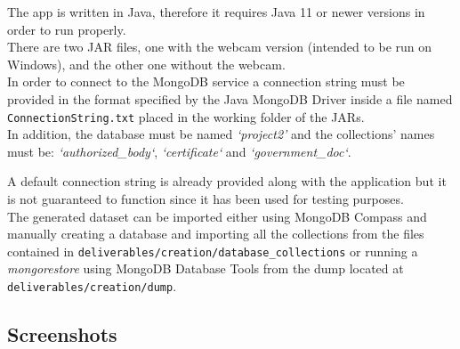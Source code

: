 \documentclass[12pt, a4paper]{article}
\begin{document}
The app is written in Java, therefore it requires Java 11 or newer versions in order to 
run properly. \\
There are two JAR files, one with the webcam version (intended to be run on Windows), 
and the other one without the webcam. \\
In order to connect to the MongoDB service a connection string must be provided in the
format specified by the Java MongoDB Driver inside a file named \\
\texttt{ConnectionString.txt} placed in the working folder of the JARs. \\
In addition, the database must be named \emph{‘project2’} and the collections' names must 
be: \emph{‘authorized\_body‘}, \emph{‘certificate‘} and \emph{‘government\_doc‘}.

\noindent
A default connection string is already provided along with the application but it is not
guaranteed to function since it has been used for testing purposes. \\
The generated dataset can be imported either using MongoDB Compass and manually creating
a database and importing all the collections from the files contained in 
\texttt{deliverables/creation/database\_collections} or running a \\ \emph{mongorestore}
using MongoDB Database Tools from the dump located at \\
\texttt{deliverables/creation/dump}. 

\clearpage %

\subsection{Screenshots}
\end{document}

